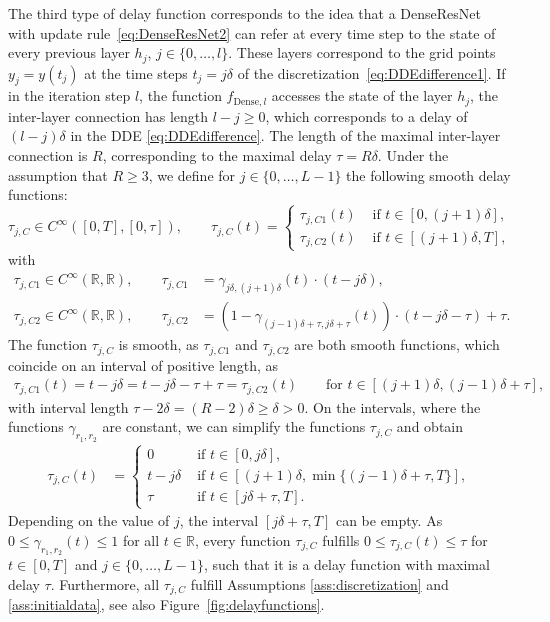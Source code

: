 \documentclass[10pt]{article}
\numberwithin{equation}{section}
\begin{document}
	The third type of delay function corresponds to the idea that a DenseResNet with update rule~\eqref{eq:DenseResNet2} can refer at every time step to the state of every previous layer $h_j$, $j\in \{0,\ldots,l\}$. These layers correspond to the grid points $y_j = y(t_j)$ at the time steps $t_j = j\delta$ of the discretization~\eqref{eq:DDEdifference1}. If in the iteration step $l$, the function $f_{\text{Dense},l}$ accesses the state of the layer $h_j$, the inter-layer connection has length $l-j \geq 0$, which corresponds to a delay of $(l-j)\delta$ in the DDE \eqref{eq:DDEdifference}. The length of the maximal inter-layer connection is $R$, corresponding to the maximal delay $\tau = R\delta$. Under the assumption that $R\geq 3$, we define for $j \in \{0,\ldots,L-1\}$ the following smooth delay functions:
	\begin{equation*}
		\tau_{j,C} \in C^\infty([0,T],[0,\tau]), \qquad \tau_{j,C}(t) =\begin{cases}
			\tau_{j,C1}(t)  &\text{ if } t \in [0,(j+1) \delta], \\
			\tau_{j,C2}(t) &\text{ if } t \in [(j+1) \delta,T],
		\end{cases}
	\end{equation*}
	with 
	\begin{align*}
		\tau_{j,C1}\in C^\infty(\mathbb{R},\mathbb{R}), \qquad \tau_{j,C1} &= \gamma_{j\delta,(j+1)\delta}(t) \cdot (t-j\delta), \\
		\tau_{j,C2}\in C^\infty(\mathbb{R},\mathbb{R}), \qquad \tau_{j,C2} &= (1-\gamma_{(j-1)\delta+\tau,j\delta+\tau}(t)) \cdot (t-j\delta-\tau) + \tau.
	\end{align*}
	The function $\tau_{j,C}$ is smooth, as $\tau_{j,C1}$ and $\tau_{j,C2}$ are both smooth functions, which coincide on an interval of positive length, as
	\begin{align*}
		\tau_{j,C1}(t) = t-j\delta = t-j\delta-\tau+\tau = \tau_{j,C2}(t) \qquad \text{for } t \in [(j+1)\delta,(j-1)\delta+\tau],
	\end{align*}
	with interval length $\tau-2\delta = (R-2)\delta \geq \delta > 0$. On the intervals, where the functions $\gamma_{r_1,r_2}$ are constant, we can simplify the functions $\tau_{j,C}$ and obtain
	\begin{align*}
		\tau_{j,C}(t)&=\begin{cases}
			0  &\text{ if } t \in [0,j\delta], \\
			t-j\delta  &\text{ if } t \in [(j+1)\delta,\min\{(j-1)\delta+\tau,T\}], \\
			\tau &\text{ if } t \in [j\delta+\tau,T].
		\end{cases}
	\end{align*}
	Depending on the value of $j$, the interval $[j\delta+\tau,T]$ can be empty. As $0 \leq \gamma_{r_1,r_2}(t)\leq 1$ for all $t\in \mathbb{R}$, every function $\tau_{j,C}$ fulfills $0\leq \tau_{j,C}(t)\leq \tau$ for $t\in[0,T]$ and $j\in\{0,\ldots,L-1\}$, such that it is a delay function with maximal delay $\tau$. Furthermore, all $\tau_{j,C}$ fulfill Assumptions \ref{ass:discretization} and \ref{ass:initialdata}, see also Figure~\ref{fig:delayfunctions}. \medskip
	
\end{document}
